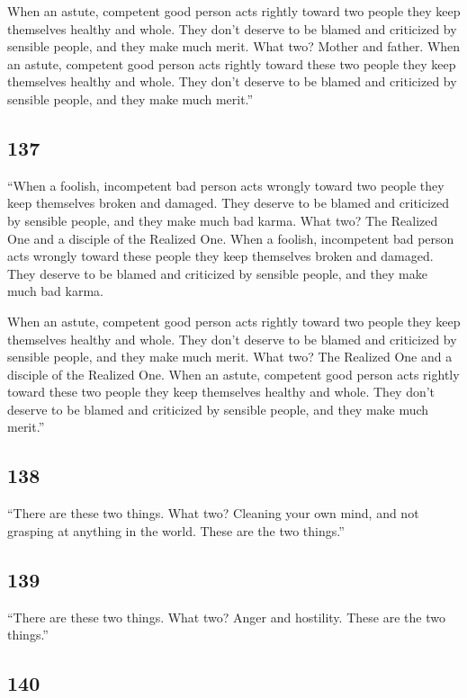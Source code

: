 \documentclass[12pt,openany]{book}%
\begin{document}
When an astute, competent good person acts rightly toward two people they keep themselves healthy and whole. They don’t deserve to be blamed and criticized by sensible people, and they make much merit. What two? Mother and father. When an astute, competent good person acts rightly toward these two people they keep themselves healthy and whole. They don’t deserve to be blamed and criticized by sensible people, and they make much merit.” 

\subsection*{137 }

“When a foolish, incompetent bad person acts wrongly toward two people they keep themselves broken and damaged. They deserve to be blamed and criticized by sensible people, and they make much bad karma. What two? The Realized One and a disciple of the Realized One. When a foolish, incompetent bad person acts wrongly toward these people they keep themselves broken and damaged. They deserve to be blamed and criticized by sensible people, and they make much bad karma. 

When an astute, competent good person acts rightly toward two people they keep themselves healthy and whole. They don’t deserve to be blamed and criticized by sensible people, and they make much merit. What two? The Realized One and a disciple of the Realized One. When an astute, competent good person acts rightly toward these two people they keep themselves healthy and whole. They don’t deserve to be blamed and criticized by sensible people, and they make much merit.” 

\subsection*{138 }

“There are these two things. What two? Cleaning your own mind, and not grasping at anything in the world. These are the two things.” 

\subsection*{139 }

“There are these two things. What two? Anger and hostility. These are the two things.” 

\subsection*{140 }
\end{document}
